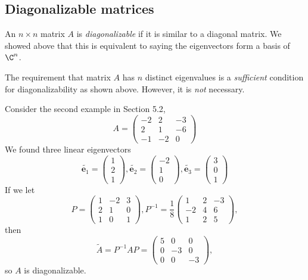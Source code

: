 \documentclass[a4paper]{article}
\begin{document}
\subsection{Diagonalizable matrices}
\begin{defi}
  An $n\times n$ matrix $A$ is \emph{diagonalizable} if it is similar to a diagonal matrix. We showed above that this is equivalent to saying the eigenvectors form a basis of $\C^n$.
\end{defi}

The requirement that matrix $A$ has $n$ distinct eigenvalues is a \emph{sufficient} condition for diagonalizability as shown above. However, it is \emph{not} necessary.

Consider the second example in Section 5.2,
\[
  A = \begin{pmatrix}
    -2 & 2 & -3\\
    2 & 1 & -6\\
    -1 & -2 & 0
  \end{pmatrix}
\]
We found three linear eigenvectors
\[
  \tilde{\mathbf{e}_1} =
  \begin{pmatrix}
    1\\2\\1
  \end{pmatrix}, \tilde{\mathbf{e}_2} =
  \begin{pmatrix}
    -2\\1\\0
  \end{pmatrix}, \tilde{\mathbf{e}_3} =
  \begin{pmatrix}
    3\\0\\1
  \end{pmatrix}
\]
If we let
\[
  P =
  \begin{pmatrix}
    1 & -2 & 3\\
    2 & 1 & 0\\
    1 & 0 & 1
  \end{pmatrix}, P^{-1} = \frac{1}{8}
  \begin{pmatrix}
    1 & 2 & -3\\
    -2 & 4 & 6\\
    1 & 2 & 5
  \end{pmatrix},
\]
then
\[
  \tilde{A} = P^{-1}AP =
  \begin{pmatrix}
    5 & 0 & 0\\
    0 & -3 & 0\\
    0 & 0 & -3
  \end{pmatrix},
\]
so $A$ is diagonalizable.
\end{document}
